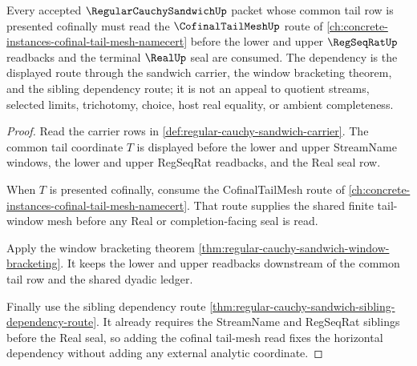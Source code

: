 \begin{theorem}
\label{thm:regular-cauchy-sandwich-cofinal-tail-mesh-dependency-route}
Every accepted $\RegularCauchySandwichUp$ packet whose common tail row is presented cofinally must read the $\CofinalTailMeshUp$ route of \autoref{ch:concrete-instances-cofinal-tail-mesh-namecert} before the lower and upper $\RegSeqRatUp$ readbacks and the terminal $\RealUp$ seal are consumed. The dependency is the displayed route through the sandwich carrier, the window bracketing theorem, and the sibling dependency route; it is not an appeal to quotient streams, selected limits, trichotomy, choice, host real equality, or ambient completeness.
\end{theorem}
\begin{proof}
Read the carrier rows in \autoref{def:regular-cauchy-sandwich-carrier}. The common tail coordinate $T$ is displayed before the lower and upper StreamName windows, the lower and upper RegSeqRat readbacks, and the Real seal row.

When $T$ is presented cofinally, consume the CofinalTailMesh route of \autoref{ch:concrete-instances-cofinal-tail-mesh-namecert}. That route supplies the shared finite tail-window mesh before any Real or completion-facing seal is read.

Apply the window bracketing theorem \autoref{thm:regular-cauchy-sandwich-window-bracketing}. It keeps the lower and upper readbacks downstream of the common tail row and the shared dyadic ledger.

Finally use the sibling dependency route \autoref{thm:regular-cauchy-sandwich-sibling-dependency-route}. It already requires the StreamName and RegSeqRat siblings before the Real seal, so adding the cofinal tail-mesh read fixes the horizontal dependency without adding any external analytic coordinate.
\end{proof}
